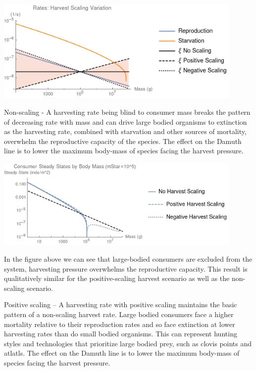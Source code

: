 \documentclass[]{rsos}%
\begin{document}
\includegraphics[width=0.9\textwidth]{harvest_scaling_plot.png}\\

\vspace{0.5cm}

Non-scaling - A harvesting rate being blind to consumer mass breaks the pattern of decreasing rate with mass and can drive large bodied organisms to extinction as the harvesting rate, combined with starvation and other sources of mortality, overwhelm the reproductive capacity of the species. The effect on the Damuth line is to lower the maximum body-mass of species facing the harvest pressure.\\

\vspace{0.5cm}

\includegraphics[width=0.9\textwidth]{harvest_damuth_plot.png}\\

\vspace{0.5cm}

In the figure above we can see that large-bodied consumers are excluded from the system, harvesting pressure overwhelms the reproductive capacity. This result is qualitatively similar for the positive-scaling harvest scenario as well as the non-scaling scenario.


Positive scaling – A harvesting rate with positive scaling maintains the basic pattern of a non-scaling harvest rate. Large bodied consumers face a higher mortality relative to their reproduction rates and so face extinction at lower harvesting rates than do small bodied organisms. This can represent hunting styles and technologies that prioritize large bodied prey, such as clovis points and atlatls.  The effect on the Damuth line is to lower the maximum body-mass of species facing the harvest pressure.\\
\end{document}

